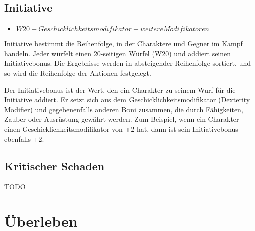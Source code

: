 \documentclass{book}
\begin{document}
\section{Initiative}
\begin{itemize}
\item $W20 + Geschicklichkeitsmodifikator + weitere Modifikatoren$
\end{itemize}

Initiative bestimmt die Reihenfolge, in der Charaktere und Gegner im Kampf handeln. Jeder würfelt einen 20-seitigen Würfel (W20) und addiert seinen Initiativebonus. Die Ergebnisse werden in absteigender Reihenfolge sortiert, und so wird die Reihenfolge der Aktionen festgelegt.

Der Initiativebonus ist der Wert, den ein Charakter zu seinem Wurf für die Initiative addiert. Er setzt sich aus dem Geschicklichkeitsmodifikator (Dexterity Modifier) und gegebenenfalls anderen Boni zusammen, die durch Fähigkeiten, Zauber oder Ausrüstung gewährt werden. Zum Beispiel, wenn ein Charakter einen Geschicklichkeitsmodifikator von +2 hat, dann ist sein Initiativebonus ebenfalls +2.

\section{Kritischer Schaden}
TODO

\chapter{Überleben}

\end{document}
